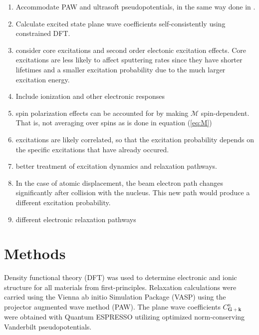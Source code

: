 \documentclass{article}
\begin{document}
\begin{enumerate}
    \item Accommodate PAW and ultrasoft pseudopotentials, in the same way done in \cite{Shishkin2006a, Gajdos2006, Paier2005}.
    \item Calculate excited state plane wave coefficients self-consistently using constrained DFT.
    \item consider core excitations and second order electonic excitation effects.  Core excitations are less likely to affect sputtering rates since they have shorter lifetimes and a smaller excitation probability due to the much larger excitation energy.
    \item Include ionization and other electronic responses
    \item spin polarization effects can be accounted for by making $\mathcal{M}$ spin-dependent.  That is, not averaging over spins as is done in equation (\ref{eq:M})
    \item excitations are likely correlated, so that the excitation probability depends on the specific excitations that have already occured.
    \item better treatment of excitation dynamics\cite{Kretschmer2020} and relaxation pathways\cite{}.
    \item In the case of atomic displacement, the beam electron path changes significantly after collision with the nucleus.  This new path would produce a different excitation probability.
    \item different electronic relaxation pathways\cite{Lagarde2014,Kozawa2014,Nie2015,Shi2013a}
\end{enumerate}


\section{Methods}

Density functional theory (DFT)\cite{Hohenberg1964, Kohn1965} was used to determine electronic and ionic structure for all materials from first-principles.  Relaxation calculations were carried using the Vienna ab initio Simulation Package (VASP)\cite{Kresse1996, Kresse1996a} using the projector augmented wave method (PAW)\cite{Blochl1994}.  The plane wave coefficients $C^n_\mathbf{G+k}$ were obtained with Quantum ESPRESSO\cite{Giannozzi2009} utilizing optimized norm-conserving Vanderbilt pseudopotentials\cite{Hamann2013, Schlipf2015}.
\end{document}
